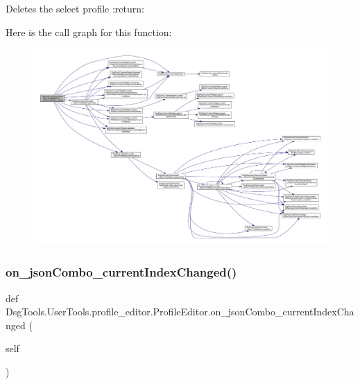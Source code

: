\begin{DoxyVerb}Deletes the select profile
:return:
\end{DoxyVerb}
 Here is the call graph for this function\+:
\nopagebreak
\begin{figure}[H]
\begin{center}
\leavevmode
\includegraphics[width=350pt]{class_dsg_tools_1_1_user_tools_1_1profile__editor_1_1_profile_editor_a42cac187ac72a40e3e81c7ced772ff93_cgraph}
\end{center}
\end{figure}
\mbox{\label{class_dsg_tools_1_1_user_tools_1_1profile__editor_1_1_profile_editor_a57f897fed81656d7ed6fe6ca0ce5012d}} 
\subsubsection{\texorpdfstring{on\+\_\+json\+Combo\+\_\+current\+Index\+Changed()}{on\_jsonCombo\_currentIndexChanged()}}
{\footnotesize\ttfamily def Dsg\+Tools.\+User\+Tools.\+profile\+\_\+editor.\+Profile\+Editor.\+on\+\_\+json\+Combo\+\_\+current\+Index\+Changed (\begin{DoxyParamCaption}\item[{}]{self }\end{DoxyParamCaption})}


